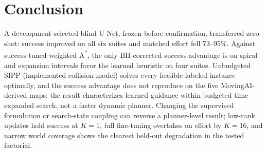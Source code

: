 \documentclass[letterpaper]{article} %
\begin{document}
\section{Conclusion}

A development-selected blind U-Net, frozen before confirmation, transferred zero-shot: success improved on all six suites and matched effort fell 73--95\%. Against success-tuned weighted A\textsuperscript{*}, the only BH-corrected success advantage is on spiral and expansion intervals favor the learned heuristic on four suites. Unbudgeted SIPP (implemented collision model) solves every feasible-labeled instance optimally, and the success advantage does not reproduce on the five MovingAI-derived maps: the result characterizes learned guidance within budgeted time-expanded search, not a faster dynamic planner. Changing the supervised formulation or search-state coupling can reverse a planner-level result; low-rank updates hold success at $K{=}1$, full fine-tuning overtakes on effort by $K{=}16$, and narrow world coverage shows the clearest held-out degradation in the tested factorial.



\end{document}
